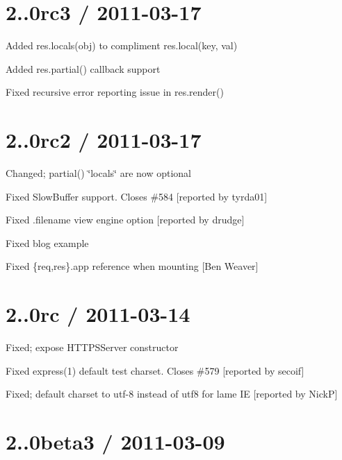 \section*{2..\+0rc3 / 2011-\/03-\/17 }


\begin{DoxyItemize}
\item Added {\ttfamily res.\+locals(obj)} to compliment {\ttfamily res.\+local(key, val)}
\item Added {\ttfamily res.\+partial()} callback support
\item Fixed recursive error reporting issue in {\ttfamily res.\+render()}
\end{DoxyItemize}

\section*{2..\+0rc2 / 2011-\/03-\/17 }


\begin{DoxyItemize}
\item Changed; {\ttfamily partial()} \char`\"{}locals\char`\"{} are now optional
\item Fixed {\ttfamily Slow\+Buffer} support. Closes \#584 \mbox{[}reported by tyrda01\mbox{]}
\item Fixed .filename view engine option \mbox{[}reported by drudge\mbox{]}
\item Fixed blog example
\item Fixed {\ttfamily \{req,res\}.app} reference when mounting \mbox{[}Ben Weaver\mbox{]}
\end{DoxyItemize}

\section*{2..\+0rc / 2011-\/03-\/14 }


\begin{DoxyItemize}
\item Fixed; expose {\ttfamily H\+T\+T\+P\+S\+Server} constructor
\item Fixed express(1) default test charset. Closes \#579 \mbox{[}reported by secoif\mbox{]}
\item Fixed; default charset to utf-\/8 instead of utf8 for lame I\+E \mbox{[}reported by Nick\+P\mbox{]}
\end{DoxyItemize}

\section*{2..\+0beta3 / 2011-\/03-\/09 }


